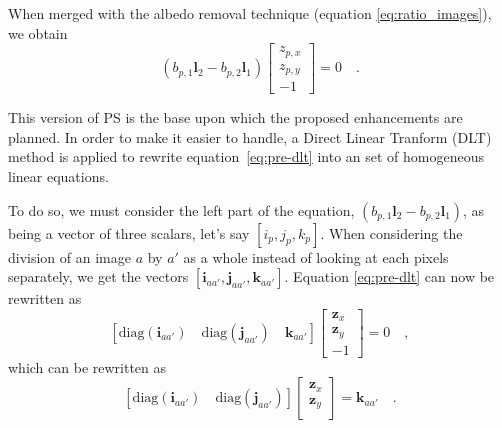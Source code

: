 When merged with the albedo removal technique (equation \eqref{eq:ratio_images}), we obtain
\begin{equation}
\label{eq:pre-dlt}
\left( b_{p,1} \mathbf{l}_2 - b_{p,2} \mathbf{l}_1 \right)
\begin{bmatrix}
z_{p,x} \\
z_{p,y} \\
-1
\end{bmatrix}
= 0  \quad.
\end{equation}

This version of PS is the base upon which the proposed enhancements are planned. In order to make it easier to handle, a Direct Linear Tranform (DLT) method is applied to rewrite equation~\eqref{eq:pre-dlt} into an set of homogeneous linear equations.

To do so, we must consider the left part of the equation, $\left( b_{p,1} \mathbf{l}_2 - b_{p,2} \mathbf{l}_1 \right)$, as being a vector of three scalars, let's say $\left[ i_p, j_p, k_p \right]$. When considering the division of an image $a$ by $a'$ as a whole instead of looking at each pixels separately, we get the vectors $\left[ \mathbf{i}_{aa'}, \mathbf{j}_{aa'}, \mathbf{k}_{aa'} \right]$. Equation \eqref{eq:pre-dlt} can now be rewritten as
\begin{equation}
\left[ \mathrm{diag}(\mathbf{i}_{aa'}) \quad \mathrm{diag}(\mathbf{j}_{aa'}) \quad \mathbf{k}_{aa'}\right]
\begin{bmatrix}
\mathbf{z}_{x} \\
\mathbf{z}_{y} \\
-1
\end{bmatrix}
= 0 \quad,
\end{equation}
which can be rewritten as
\begin{equation}
\label{eq:diagdlt}
\left[ \mathrm{diag}(\mathbf{i}_{aa'}) \quad \mathrm{diag}(\mathbf{j}_{aa'}) \right]
\begin{bmatrix}
\mathbf{z}_{x} \\
\mathbf{z}_{y} \\
\end{bmatrix}
= \mathbf{k}_{aa'} \quad.
\end{equation}

